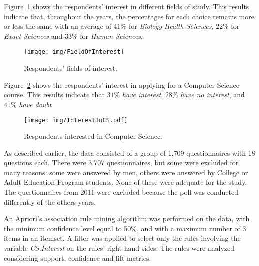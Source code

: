 Figure~\ref{fig:FieldOfInterest} shows the respondents' interest in different fields of study. This results indicate that, throughout the years, the percentages for each choice remains more or less the same with an average of $41\%$ for \emph{Biology-Health Sciences}, $22\%$ for \emph{Exact Sciences} and $33\%$ for \emph{Human Sciences}.

\begin{figure}%
\texttt{[image: img/FieldOfInterest]}%
\caption{Respondents' fields of interest.}%
\label{fig:FieldOfInterest}%
\end{figure}%

Figure~\ref{fig:InterestInCS.pdf} shows the respondents' interest in applying for a Computer Science course. This results indicate that $31\%$  \emph{have interest}, $28\%$  \emph{have no interest}, and $41\%$  \emph{have doubt}

\begin{figure}%
\texttt{[image: img/InterestInCS.pdf]}%
\caption{Respondents interested in Computer Science.}%
\label{fig:InterestInCS.pdf}%
\end{figure}%

As described earlier, the data consisted of a group of 1,709 questionnaires with 18 questions each. There were 3,707 questionnaires, but some were excluded for many reasons: some were answered by men, others were answered by College or Adult Education Program students. None of these were adequate for the study. The questionnaires from 2011 were excluded because the poll was conducted differently of the others years.

An Apriori's association rule mining algorithm was performed on the data, with the minimum confidence level equal to 50\%, and with a maximum number of 3 items in an itemset. A filter was applied to select only the rules involving the variable \emph{CS.Interest} on the rules' right-hand sides. The rules were analyzed considering support, confidence and lift metrics.